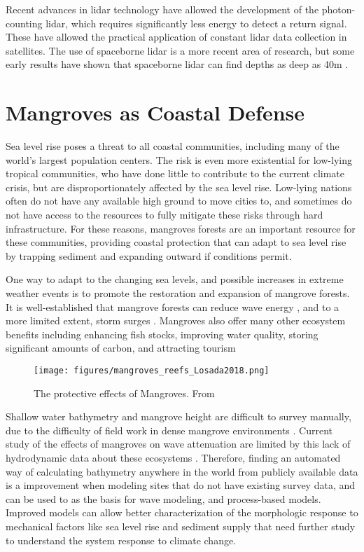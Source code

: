 Recent advances in lidar technology have allowed the development of the photon-counting lidar, which requires significantly less energy to detect a return signal. These have allowed the practical application of constant lidar data collection in satellites. The use of spaceborne lidar is a more recent area of research, but some early results have shown that spaceborne lidar can find depths as deep as 40m \parencite{Parrish2019}. 

\section{Mangroves as Coastal Defense}

Sea level rise poses a threat to all coastal communities, including many of the world's largest population centers. The risk is even more existential for low-lying tropical communities, who have done little to contribute to the current climate crisis, but are disproportionately affected by the sea level rise. Low-lying nations often do not have any available high ground to move cities to, and sometimes do not have access to the resources to fully mitigate these risks through hard infrastructure. For these reasons, mangroves forests are an important resource for these communities, providing coastal protection that can adapt to sea level rise by trapping sediment and expanding outward if conditions permit.

One way to adapt to the changing sea levels, and possible increases in extreme weather events is to promote the restoration and expansion of mangrove forests. It is well-established that mangrove forests can reduce wave energy \parencite{Maza2019,Menendez2020,Hadi2003}, and to a more limited extent, storm surges \parencite{Montgomery2019a,Chen2021,Mcivor2012}. Mangroves also offer many other ecosystem benefits including enhancing fish stocks, improving water quality, storing significant amounts of carbon, and attracting tourism \parencite{Atkinson2016b}

\begin{figure}[htbp]
      \centering
      \texttt{[image: figures/mangroves\_reefs\_Losada2018.png]}
      \caption{The protective effects of Mangroves. From \parencite{Losada2018}}
      \label{mangrove-protection-diagram}
\end{figure}


Shallow water bathymetry and mangrove height are difficult to survey manually, due to the difficulty of field work in dense mangrove environments \parencite{Gijsman2021}. Current study of the effects of mangroves on wave attenuation are limited by this lack of hydrodynamic data about these ecosystems \parencite{Horstman2014}.  Therefore, finding an automated way of calculating bathymetry anywhere in the world from publicly available data is a improvement when modeling sites that do not have existing survey data, and can be used to as the basis for wave modeling, and process-based models. Improved models can allow better characterization of the morphologic response to mechanical factors like sea level rise and sediment supply that need further study to understand the system response to climate change.

